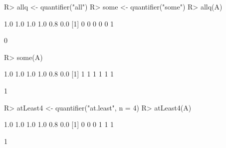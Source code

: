 \documentclass{article}\usepackage[]{graphicx}\usepackage[]{color}
\begin{document}
\begin{Schunk}
% --begin: "quant6"
\begin{Sinput}
R> allq <- quantifier("all")
R> some <- quantifier("some")
R> allq(A)
\end{Sinput}
\begin{Soutput}
[1] 1.0 1.0 1.0 1.0 0.8 0.0
[1] 0 0 0 0 0 1
\end{Soutput}
\begin{Soutput}
[1] 0
\end{Soutput}
\begin{Sinput}
R> some(A)
\end{Sinput}
\begin{Soutput}
[1] 1.0 1.0 1.0 1.0 0.8 0.0
[1] 1 1 1 1 1 1
\end{Soutput}
\begin{Soutput}
[1] 1
\end{Soutput}
%
% --end: "quant6"
\end{Schunk}

\begin{Schunk}
% --begin: "quant7"
\begin{Sinput}
R> atLeast4 <- quantifier("at.least", n = 4)
R> atLeast4(A)
\end{Sinput}
\begin{Soutput}
[1] 1.0 1.0 1.0 1.0 0.8 0.0
[1] 0 0 0 1 1 1
\end{Soutput}
\begin{Soutput}
[1] 1
\end{Soutput}
%
% --end: "quant7"
\end{Schunk}
\end{document}
